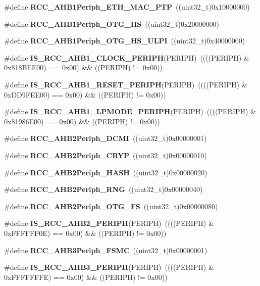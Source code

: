 \begin{DoxyCompactItemize}
\item 
\#define \textbf{ R\+C\+C\+\_\+\+A\+H\+B1\+Periph\+\_\+\+E\+T\+H\+\_\+\+M\+A\+C\+\_\+\+P\+TP}~((uint32\+\_\+t)0x10000000)
\item 
\#define \textbf{ R\+C\+C\+\_\+\+A\+H\+B1\+Periph\+\_\+\+O\+T\+G\+\_\+\+HS}~((uint32\+\_\+t)0x20000000)
\item 
\#define \textbf{ R\+C\+C\+\_\+\+A\+H\+B1\+Periph\+\_\+\+O\+T\+G\+\_\+\+H\+S\+\_\+\+U\+L\+PI}~((uint32\+\_\+t)0x40000000)
\item 
\#define \textbf{ I\+S\+\_\+\+R\+C\+C\+\_\+\+A\+H\+B1\+\_\+\+C\+L\+O\+C\+K\+\_\+\+P\+E\+R\+I\+PH}(P\+E\+R\+I\+PH)~((((P\+E\+R\+I\+PH) \& 0x818\+B\+E\+E00) == 0x00) \&\& ((\+P\+E\+R\+I\+P\+H) != 0x00))
\item 
\#define \textbf{ I\+S\+\_\+\+R\+C\+C\+\_\+\+A\+H\+B1\+\_\+\+R\+E\+S\+E\+T\+\_\+\+P\+E\+R\+I\+PH}(P\+E\+R\+I\+PH)~((((P\+E\+R\+I\+PH) \& 0x\+D\+D9\+F\+E\+E00) == 0x00) \&\& ((\+P\+E\+R\+I\+P\+H) != 0x00))
\item 
\#define \textbf{ I\+S\+\_\+\+R\+C\+C\+\_\+\+A\+H\+B1\+\_\+\+L\+P\+M\+O\+D\+E\+\_\+\+P\+E\+R\+I\+PH}(P\+E\+R\+I\+PH)~((((P\+E\+R\+I\+PH) \& 0x81986\+E00) == 0x00) \&\& ((\+P\+E\+R\+I\+P\+H) != 0x00))
\item 
\#define \textbf{ R\+C\+C\+\_\+\+A\+H\+B2\+Periph\+\_\+\+D\+C\+MI}~((uint32\+\_\+t)0x00000001)
\item 
\#define \textbf{ R\+C\+C\+\_\+\+A\+H\+B2\+Periph\+\_\+\+C\+R\+YP}~((uint32\+\_\+t)0x00000010)
\item 
\#define \textbf{ R\+C\+C\+\_\+\+A\+H\+B2\+Periph\+\_\+\+H\+A\+SH}~((uint32\+\_\+t)0x00000020)
\item 
\#define \textbf{ R\+C\+C\+\_\+\+A\+H\+B2\+Periph\+\_\+\+R\+NG}~((uint32\+\_\+t)0x00000040)
\item 
\#define \textbf{ R\+C\+C\+\_\+\+A\+H\+B2\+Periph\+\_\+\+O\+T\+G\+\_\+\+FS}~((uint32\+\_\+t)0x00000080)
\item 
\#define \textbf{ I\+S\+\_\+\+R\+C\+C\+\_\+\+A\+H\+B2\+\_\+\+P\+E\+R\+I\+PH}(P\+E\+R\+I\+PH)~((((P\+E\+R\+I\+PH) \& 0x\+F\+F\+F\+F\+F\+F0\+E) == 0x00) \&\& ((\+P\+E\+R\+I\+P\+H) != 0x00))
\item 
\#define \textbf{ R\+C\+C\+\_\+\+A\+H\+B3\+Periph\+\_\+\+F\+S\+MC}~((uint32\+\_\+t)0x00000001)
\item 
\#define \textbf{ I\+S\+\_\+\+R\+C\+C\+\_\+\+A\+H\+B3\+\_\+\+P\+E\+R\+I\+PH}(P\+E\+R\+I\+PH)~((((P\+E\+R\+I\+PH) \& 0x\+F\+F\+F\+F\+F\+F\+F\+E) == 0x00) \&\& ((\+P\+E\+R\+I\+P\+H) != 0x00))
\item 

\end{DoxyCompactItemize}
